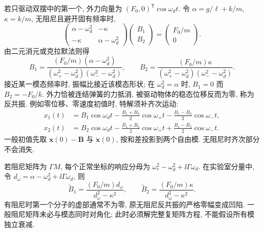 若只驱动双摆中的第一个, 外力向量为 $(F_0,0)^{\mathsf T}\cos\omega_dt$. 令 $\alpha=g/\ell+k/m$, $\kappa=k/m$, 无阻尼且避开固有频率时,
\[
\begin{pmatrix}\alpha-\omega_d^2&-\kappa\\-\kappa&\alpha-\omega_d^2\end{pmatrix}
\begin{pmatrix}B_1\\B_2\end{pmatrix}=\begin{pmatrix}F_0/m\\0\end{pmatrix}.
\]
由二元消元或克拉默法则得
\[
B_1=\frac{(F_0/m)(\alpha-\omega_d^2)}{(\omega_+^2-\omega_d^2)(\omega_-^2-\omega_d^2)},\qquad
B_2=\frac{(F_0/m)\kappa}{(\omega_+^2-\omega_d^2)(\omega_-^2-\omega_d^2)}.
\]
接近某一模态频率时, 振幅比接近该模态形状; 在 $\omega_d^2=\alpha$ 时, $B_1=0$ 而 $B_2=-F_0/k$. 外力恰被连结弹簧的力抵消, 被驱动物体的稳态位移反而为零, 称为反共振. 例如零位移、零速度初值时, 特解须补齐次运动:
\[
\begin{split}
x_1(t)&=B_1\cos\omega_dt-\frac{B_1+B_2}{2}\cos\omega_+t
-\frac{B_1-B_2}{2}\cos\omega_-t,\\
x_2(t)&=B_2\cos\omega_dt-\frac{B_1+B_2}{2}\cos\omega_+t
+\frac{B_1-B_2}{2}\cos\omega_-t.
\end{split}
\]
一般初值先取 $\boldsymbol x(0)-\boldsymbol B$ 与 $\dot{\boldsymbol x}(0)$, 按和差投影到两个自由模. 无阻尼时齐次部分不会消失.

若阻尼矩阵为 $\Gamma M$, 每个正常坐标的响应分母为 $\omega_r^2-\omega_d^2+\ii\Gamma\omega_d$. 在实验室分量中, 令 $d_\omega=\alpha-\omega_d^2+\ii\Gamma\omega_d$, 则
\[
\widetilde B_1=\frac{(F_0/m)d_\omega}{d_\omega^2-\kappa^2},\qquad
\widetilde B_2=\frac{(F_0/m)\kappa}{d_\omega^2-\kappa^2}.
\]
有阻尼时第一个分子的虚部通常不为零, 原无阻尼反共振的严格零幅变成凹陷. 一般阻尼矩阵未必与模态同时对角化; 此时必须解完整复矩阵方程, 不能假设所有模独立衰减.
